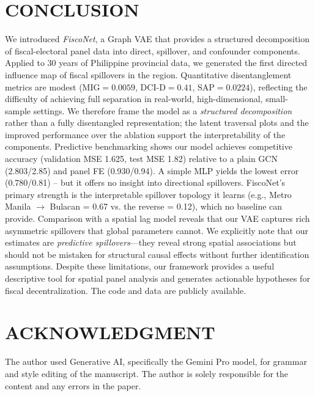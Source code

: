 \documentclass[conference]{IEEEtran}
\begin{document}
\section{CONCLUSION}
We introduced \textit{FiscoNet}, a Graph VAE that provides a structured decomposition of fiscal-electoral panel data into direct, spillover, and confounder components. Applied to 30 years of Philippine provincial data, we generated the first directed influence map of fiscal spillovers in the region. Quantitative disentanglement metrics are modest ($\text{MIG}=0.0059$, $\text{DCI-D}=0.41$, $\text{SAP}=0.0224$), reflecting the difficulty of achieving full separation in real-world, high-dimensional, small-sample settings. We therefore frame the model as a \textit{structured decomposition} rather than a fully disentangled representation; the latent traversal plots and the improved performance over the ablation support the interpretability of the components. Predictive benchmarking shows our model achieves competitive accuracy (validation MSE 1.625, test MSE 1.82) relative to a plain GCN (2.803/2.85) and panel FE (0.930/0.94). A simple MLP yields the lowest error (0.780/0.81) – but it offers no insight into directional spillovers. FiscoNet’s primary strength is the interpretable spillover topology it learns (e.g., Metro Manila $\to$ Bulacan = 0.67 vs. the reverse = 0.12), which no baseline can provide. Comparison with a spatial lag model reveals that our VAE captures rich asymmetric spillovers that global parameters cannot. We explicitly note that our estimates are \textit{predictive spillovers}—they reveal strong spatial associations but should not be mistaken for structural causal effects without further identification assumptions. Despite these limitations, our framework provides a useful descriptive tool for spatial panel analysis and generates actionable hypotheses for fiscal decentralization. The code and data are publicly available.

\section*{ACKNOWLEDGMENT}
The author used Generative AI, specifically the Gemini Pro model, for grammar and style editing of the manuscript. The author is solely responsible for the content and any errors in the paper.
\end{document}

